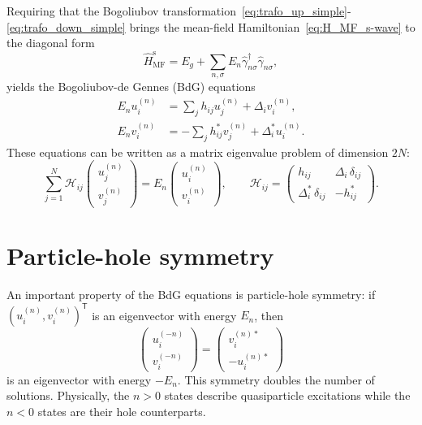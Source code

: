 \documentclass[11pt,a4paper,twoside,openany]{report}
\begin{document}
Requiring that the Bogoliubov transformation~\eqref{eq:trafo_up_simple}-\eqref{eq:trafo_down_simple} brings the mean-field Hamiltonian~\eqref{eq:H_MF_s-wave} to the diagonal form
\begin{equation}
  \hat{H}_{\mathrm{MF}}^{\mathrm{s}} = E_g + \sum_{n,\sigma} E_{n} \hat{\gamma}_{n\sigma}^\dagger \hat{\gamma}_{n\sigma},
  \label{eq:H_diag_swave}
\end{equation}
yields the Bogoliubov-de Gennes (BdG) equations
\begin{equation}
  \boxed{
  \begin{aligned}
    E_{n} u_{i}^{(n)} &= \sum_{j} h_{ij} u_{j}^{(n)} + \Delta_{i} v_{i}^{(n)}, \\
    E_{n} v_{i}^{(n)} &= -\sum_{j} h_{ij}^{*} v_{j}^{(n)} + \Delta_{i}^{*} u_{i}^{(n)}.
  \end{aligned}
  }
  \label{eq:BdG_swave}
\end{equation}
These equations can be written as a matrix eigenvalue problem of dimension \(2N\):
\begin{equation}
  \sum_{j=1}^{N} \mathcal{H}_{ij}
  \begin{pmatrix} u_{j}^{(n)} \\[2pt] v_{j}^{(n)} \end{pmatrix}
  = E_{n} \begin{pmatrix} u_{i}^{(n)} \\[2pt] v_{i}^{(n)} \end{pmatrix},
  \qquad
  \mathcal{H}_{ij} =
  \begin{pmatrix}
    h_{ij} & \Delta_{i}\,\delta_{ij} \\[4pt]
    \Delta_{i}^{*}\,\delta_{ij} & -h_{ij}^{*}
  \end{pmatrix}.
  \label{eq:M_swave}
\end{equation}

\section{Particle-hole symmetry}

An important property of the BdG equations is particle-hole symmetry: if \((u_i^{(n)},v_i^{(n)})^{\mathsf T}\) is an eigenvector with energy \(E_n\), then
\begin{equation}
  \begin{pmatrix} u_i^{(-n)} \\[2pt] v_i^{(-n)} \end{pmatrix}
  = \begin{pmatrix} v_i^{(n)*} \\[2pt] -u_i^{(n)*} \end{pmatrix}
  \label{eq:ph_symmetry}
\end{equation}
is an eigenvector with energy \(-E_n\).  This symmetry doubles the number of solutions. Physically, the \(n>0\) states describe quasiparticle excitations while the \(n<0\) states are their hole counterparts.
\end{document}
